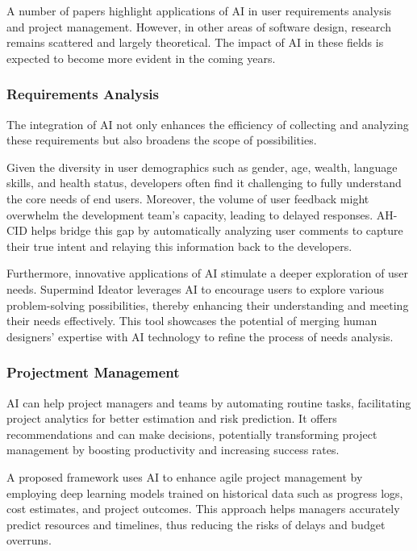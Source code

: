 \documentclass{article}
\begin{document}
A number of papers highlight applications of AI in user requirements analysis and project management. However, 
in other areas of software design, research remains scattered and largely theoretical. The impact of AI in these fields 
is expected to become more evident in the coming years.

\subsubsection{Requirements Analysis}
The integration of AI not only enhances the efficiency of collecting and analyzing 
these requirements but also broadens the scope of possibilities.

Given the diversity in user demographics such as gender, age, wealth, language skills, and health status, developers often find it 
challenging to fully understand the core needs of end users. Moreover, the volume of 
user feedback might overwhelm the development team's capacity, leading to delayed responses. AH-CID helps bridge this gap by 
automatically analyzing user comments to capture their true intent and relaying this information back to the developers.\cite{icsoft21}

Furthermore, innovative applications of AI stimulate a deeper exploration of user needs. Supermind Ideator leverages AI to 
encourage users to explore various problem-solving possibilities, thereby enhancing their understanding and meeting their 
needs effectively. This tool showcases the potential of merging human designers' expertise with AI technology to refine the 
process of needs analysis.\cite{rick2023supermind}

\subsubsection{Projectment Management}
AI can help project managers and teams by automating routine tasks, facilitating project analytics for better estimation and 
risk prediction. It offers recommendations and can make decisions, potentially transforming project management by boosting 
productivity and increasing success rates.\cite{crawford2023ai}

A proposed framework\cite{8805739} uses AI to enhance agile project management by employing deep learning models trained on historical data 
such as progress logs, cost estimates, and project outcomes. This approach helps managers accurately predict resources and 
timelines, thus reducing the risks of delays and budget overruns.
\end{document}
